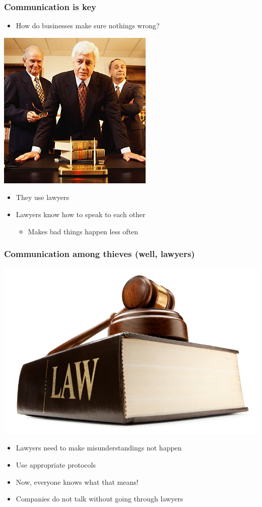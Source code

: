 \documentclass[bigger]{beamer}
\begin{document}
\begin{frame}
\frametitle{Communication is key}
\label{sec-2}


\begin{itemize}
\item How do businesses make sure nothings wrong?
\end{itemize}

\pause

\includegraphics[scale=0.5]{../pictures/lawyer.png}

\begin{itemize}
\item They use lawyers
\item Lawyers know how to speak to each other
\begin{itemize}
\item Makes bad things happen less often
\end{itemize}
\end{itemize}
\end{frame}
\begin{frame}
\frametitle{Communication among thieves (well, lawyers)}
\label{sec-3}


\includegraphics{../pictures/law-book-gavel.jpg}

\begin{itemize}
\item Lawyers need to make misunderstandings not happen
\item Use appropriate protocols
\item Now, everyone knows what that means!
\item Companies do not talk without going through lawyers
\end{itemize}
\end{frame}
\end{document}
